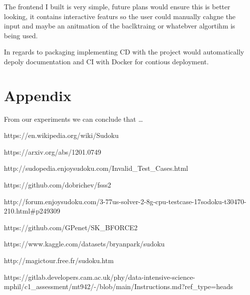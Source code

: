\documentclass{report}
\begin{document}
The frontend I built is very simple, future plans would ensure this is better looking, it contains interactive featurs so the user could manually cahgne the input and maybe an anitmation of the baclktraing or whatebver algortihm is being used.

In regards to packaging implementing CD with the project would automatically depoly documentation and CI with Docker for contious deployment.

\section{Appendix}

From our experiments we can conclude that \ldots

\begin{thebibliography}{9}

    https://en.wikipedia.org/wiki/Sudoku

    https://arxiv.org/abs/1201.0749

    http://sudopedia.enjoysudoku.com/Invalid\_Test\_Cases.html

    https://github.com/dobrichev/fsss2

    http://forum.enjoysudoku.com/3-77us-solver-2-8g-cpu-testcase-17sodoku-t30470-210.html\#p249309

    https://github.com/GPenet/SK\_BFORCE2

    https://www.kaggle.com/datasets/bryanpark/sudoku

    http://magictour.free.fr/sudoku.htm

    https://gitlab.developers.cam.ac.uk/phy/data-intensive-science-mphil/c1\_assessment/mt942/-/blob/main/Instructions.md?ref\_type=heads

\end{thebibliography}
\end{document}
